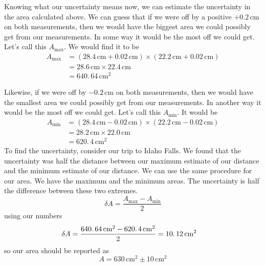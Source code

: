 \documentclass[twoside,11pt,ShortChapTitles]{BYUTextbook}
\begin{document}
Knowing what our uncertainty means now, we can estimate the uncertainty in the area calculated above.  We can guess that if we were off by a positive
$+0.2\,\text{cm} $ on both measurements, then we would have the biggest area we could possibly
get from our measurements. In some way it would be the most off we could get.
Let's call this $A_{\max}.$ We would find it to be
\begin{align*}
A_{\max} &=\left(  28.4\,\text{cm} +0.02\,\text{cm} \right)  \times\left(  22.2\,\text{cm} +0.02\,\text{cm} \right)\\
&=28.6\,\text{cm} \times22.4\,\text{cm}\\
&=\allowbreak640.\,\allowbreak64\,\text{cm} ^{2}
\end{align*}


Likewise, if we were off by $-0.2\,\text{cm} $ on both measurements, then we would have the smallest area we could possibly
get from our measurements. In another way it would be the most off we could
get. Let's call this $A_{\min}.$ It would be
\begin{align*}
A_{\min}  & =\left(  28.4\,\text{cm} -0.02\,\text{cm} \right)  \times\left(  22.2\,\text{cm} -0.02\,\text{cm} \right) \\
& =28.2\,\text{cm} \times22.0\,\text{cm} \\
& =\allowbreak\allowbreak620.\,\allowbreak4\,\text{cm} ^{2}\end{align*}
To find the uncertainty, consider our trip to Idaho Falls. We found that the
uncertainty was half the distance between our maximum estimate of our distance
and the minimum estimate of our distance. We can use the same procedure for
our area. We have the maximum and the minimum areas. The uncertainty is half
the difference between these two extremes.\[
\delta A=\frac{A_{\max}-A_{\min}}{2}
\]
using our numbers\begin{align*}
\delta A  & =\frac{\allowbreak640.\,\allowbreak64\,\text{cm} ^{2}-\allowbreak\allowbreak620.\,\allowbreak4\,\text{cm} ^{2}}{2}=10.\,\allowbreak12\,\text{cm} ^{2}\end{align*}
so our area should be reported as
\[
A=630\,\text{cm} ^{2}\pm10\,\text{cm} ^{2}
\]
\end{document}
